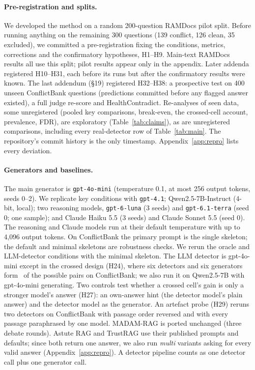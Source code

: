 \paragraph{Pre-registration and splits.}
We developed the method on a random 200-question RAMDocs pilot split. Before running anything on the remaining 300
questions (139 conflict, 126 clean, 35 excluded), we committed a pre-registration fixing the conditions, metrics,
corrections and the confirmatory hypotheses, H1--H9. Main-text RAMDocs results all use this split; pilot results appear only in the appendix.
Later addenda registered H10--H31, each before its runs but after the confirmatory results were known. The last
addendum (\S19) registered H32--H38: a prospective test on 400 unseen ConflictBank questions (predictions committed
before any flagged answer existed), a full judge re-score and HealthContradict. Re-analyses of seen data, some
unregistered (pooled key comparisons, break-even, the crossed-cell account, prevalence, FDR), are exploratory
(Table~\ref{tab:claims}), as are unregistered comparisons, including every real-detector row of Table~\ref{tab:main}. The repository's commit history is the only timestamp. Appendix~\ref{app:repro} lists every deviation.

\paragraph{Generators and baselines.}
The main generator is \texttt{gpt-4o-mini} \citep{openai2024gpt4o} (temperature 0.1, at most 256 output tokens, seeds
0--2). We replicate key conditions with \texttt{gpt-4.1}; Qwen2.5-7B-Instruct \citep{yang2024qwen25} (4-bit, local);
two reasoning models, \texttt{gpt-6-luna} (3 seeds) and \texttt{gpt-6.1-terra} (seed 0; one sample); and
Claude Haiku 5.5 (3 seeds) and Claude Sonnet 5.5 (seed 0). The reasoning and Claude models run at their default
temperature with up to 4,096 output tokens. On ConflictBank the primary prompt is
the single skeleton; the default and minimal skeletons are robustness checks. We rerun the oracle and LLM-detector
conditions with the minimal skeleton.
The LLM detector is gpt-4o-mini except in the crossed design (H24), where six detectors and six generators form
\hTwentyFourCells\ of the possible pairs on ConflictBank; we also run it on Qwen2.5-7B with gpt-4o-mini generating. Two controls test
whether a crossed cell's gain is only a stronger model's answer (H27): an own-answer hint (the detector model's plain
answer) and the detector model as the generator. An artefact probe (H29) reruns two detectors on
ConflictBank with passage order reversed and with every passage paraphrased by one model.
MADAM-RAG \citep{wang2025madam} is ported unchanged (three debate rounds). Astute RAG \citep{wang2025astute} and
TrustRAG \citep{zhou2025trustrag} use their published prompts and defaults; since both return one answer, we also run
\emph{multi} variants asking for every valid answer (Appendix~\ref{app:repro}). A detector pipeline counts as one
detector call plus one generator call.

